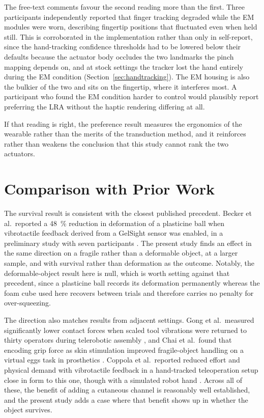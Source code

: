 \documentclass[12pt, a4paper, twoside, openright]{report}
\begin{document}
The free-text comments favour the second reading more than the first. Three
participants independently reported that finger tracking degraded while the EM
modules were worn, describing fingertip positions that fluctuated even when
held still. This is corroborated in the implementation rather than only in
self-report, since the hand-tracking confidence thresholds had to be lowered
below their defaults because the actuator body occludes the two landmarks the
pinch mapping depends on, and at stock settings the tracker lost the hand
entirely during the EM condition (Section~\ref{sec:handtracking}). The EM
housing is also the bulkier of the two and sits on the fingertip, where it
interferes most. A participant who found the EM condition harder to control
would plausibly report preferring the LRA without the haptic rendering
differing at all.

If that reading is right, the preference result measures the ergonomics of the
wearable rather than the merits of the transduction method, and it reinforces
rather than weakens the conclusion that this study cannot rank the two
actuators.

\section{Comparison with Prior Work}
\label{sec:comparison}

The survival result is consistent with the closest published precedent. Becker
et al.\ reported a \SI{48}{\percent} reduction in deformation of a plasticine
ball when vibrotactile feedback derived from a GelSight sensor was enabled, in
a preliminary study with seven participants \cite{becker2024}. The present
study finds an effect in the same direction on a fragile rather than a
deformable object, at a larger sample, and with survival rather than
deformation as the outcome. Notably, the deformable-object result here is null,
which is worth setting against that precedent, since a plasticine ball records
its deformation permanently whereas the foam cube used here recovers between
trials and therefore carries no penalty for over-squeezing.

The direction also matches results from adjacent settings. Gong et al.\
measured significantly lower contact forces when scaled tool vibrations were
returned to thirty operators during telerobotic assembly \cite{gong2024}, and
Chai et al.\ found that encoding grip force as skin stimulation improved
fragile-object handling on a virtual eggs task in prosthetics \cite{chai2022}.
Coppola et al.\ reported reduced effort and physical demand with vibrotactile
feedback in a hand-tracked teleoperation setup close in form to this one,
though with a simulated robot hand \cite{coppola2022}. Across all of these, the
benefit of adding a cutaneous channel is reasonably well established, and the
present study adds a case where that benefit shows up in whether the object
survives.
\end{document}
